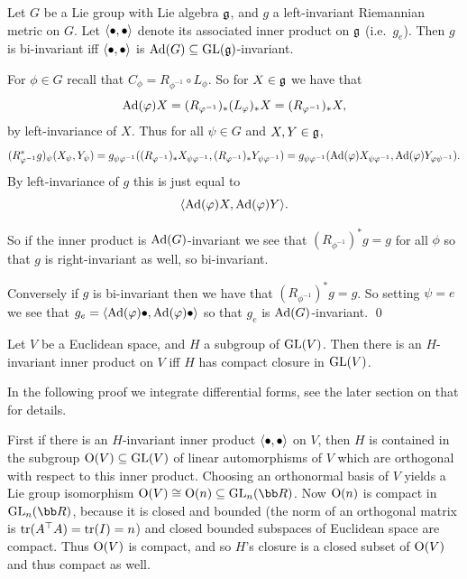 \edefn

\bprop

    Let $G$ be a Lie group with Lie algebra ${{\frak g}}$, and $g$ a left-invariant Riemannian metric on $G$.
    Let $\mathopen{}\mathclose{\left<\bullet,\bullet\right>}$ denote its associated inner product on ${{\frak g}}$ (i.e.\ $g_e$).
    Then $g$ is bi-invariant iff $\mathopen{}\mathclose{\left<\bullet,\bullet\right>}$ is ${\rm Ad}(G)\subseteq{\rm GL}({{\frak g}})$-invariant.

\eprop

\bproof

    For $\phi\in G$ recall that $C_\phi=R_{\phi^{-1}}\circ L_\phi$.
    So for $X\in{{\frak g}}$ we have that
    $$ {\rm Ad}(\varphi)X = (R_{\varphi^{-1}})_*(L_\varphi)_*X = (R_{\varphi^{-1}})_*X , $$
    by left-invariance of $X$.
    Thus for all $\psi\in G$ and $X,Y\in{{\frak g}}$,
    $$ (R_{\varphi^{-1}}^*g)_\psi(X_\psi,Y_\psi) = g_{\psi\varphi^{-1}}((R_{\varphi^{-1}})_*X_{\psi\varphi^{-1}},(R_{\varphi^{-1}})_*Y_{\psi\varphi^{-1}})
    = g_{\psi\varphi^{-1}}({\rm Ad}(\varphi)X_{\psi\varphi^{-1}},{\rm Ad}(\varphi)Y_{\varphi\psi^{-1}}) . $$
    By left-invariance of $g$ this is just equal to
    $$ \mathopen{}\mathclose{\left<{\rm Ad}(\varphi)X,{\rm Ad}(\varphi)Y\right>} . $$

    So if the inner product is ${\rm Ad}(G)$-invariant we see that $(R_{\phi^{-1}})^*g=g$ for all $\phi$ so that $g$ is right-invariant as
    well, so bi-invariant.

    Conversely if $g$ is bi-invariant then we have that $(R_{\phi^{-1}})^*g=g$.
    So setting $\psi=e$ we see that $g_e=\mathopen{}\mathclose{\left<{\rm Ad}(\varphi)\bullet,{\rm Ad}(\varphi)\bullet\right>}$ so that $g_e$ is ${\rm Ad}(G)$-invariant.
    \qed

\eproof

\blemm

    Let $V$ be a Euclidean space, and $H$ a subgroup of ${\rm GL}(V)$.
    Then there is an $H$-invariant inner product on $V$ iff $H$ has compact closure in ${\rm GL}(V)$.

\elemm

In the following proof we integrate differential forms, see the later section on that for details.

\bproof

    First if there is an $H$-invariant inner product $\mathopen{}\mathclose{\left<\bullet,\bullet\right>}$ on $V$, then $H$ is contained in the subgroup
    ${\rm O}(V)\subseteq{\rm GL}(V)$ of linear automorphisms of $V$ which are orthogonal with respect to this inner product.
    Choosing an orthonormal basis of $V$ yields a Lie group isomorphism $\orth(V)\cong\orth(n)\subseteq\gl_n(\bR)$.
    Now ${\rm O}(n)$ is compact in $\gl_n(\bR)$, because it is closed and bounded (the norm of an orthogonal matrix is
    ${\rm tr}(A^\top A)={\rm tr}(I)=n$) and closed bounded subspaces of Euclidean space are compact.
    Thus ${\rm O}(V)$ is compact, and so $H$'s closure is a closed subset of ${\rm O}(V)$ and thus compact as well.

